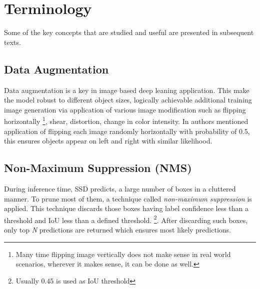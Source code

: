 
\section{Terminology}
Some of the key concepts that are studied and useful are presented in subsequent texts.

\subsection{Data Augmentation}
Data augmentation is a key in image based deep leaning application. This make the model robust to different object sizes, logically achievable  additional training image generation via application of various image modification such as flipping horizontally \footnote{Many time flipping image vertically does not make sense in real world scenarios, wherever it makes sense, it can be done as well.}, shear, distortion, change in color intensity. In \cite{liu2016ssd} authors mentioned application of flipping each image randomly horizontally with probability of 0.5, this ensures objects appear on left and right with similar likelihood.

\subsection{Non-Maximum Suppression (NMS)}
During inference time, SSD predicts, a large number of boxes in a cluttered manner. To prune most of them, a technique called \textit{non-maximum suppression} is applied. This technique discards those boxes having label confidence less than a threshold and IoU less than a defined threshold. \footnote{Usually 0.45 is used as IoU threshold}. After discarding such boxes, only top \textit{N} predictions are returned which ensures most likely predictions.
